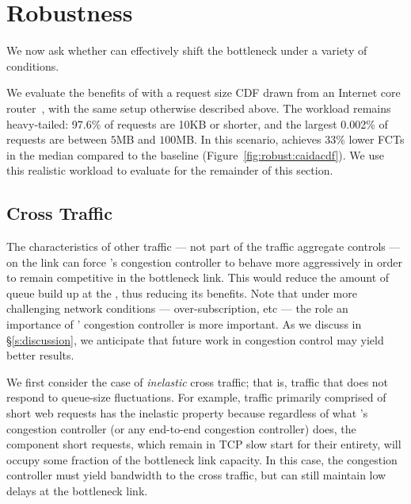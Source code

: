 \section{Robustness}\label{s:robust}

We now ask whether \name can effectively shift the bottleneck under a variety of conditions.


We evaluate the benefits of \name with a request size CDF
drawn from an Internet core router~\cite{caida-dataset}, with the same setup otherwise described above.
The workload remains heavy-tailed: 97.6\% of requests are 10KB or shorter, and the largest 0.002\% of requests are between $5$MB and $100$MB.
In this scenario, \name achieves 33\% lower FCTs in the median compared to the baseline (Figure~\ref{fig:robust:caidacdf}). We use this realistic workload to evaluate \name for the remainder of this section.


\subsection{Cross Traffic}\label{s:robust:cross}

The characteristics of other traffic --- not part of the traffic aggregate \name controls --- on the link can force \name's congestion controller to behave more aggressively in order to remain competitive in the bottleneck link. This would reduce the amount of queue build up at the \name, thus reducing its benefits.
Note that under more challenging network conditions --- over-subscription, etc --- the role an importance of \name' congestion controller is more important.  As we discuss in \S\ref{s:discussion}, we anticipate that future work in congestion control may yield better results.


 We first consider the case of \emph{inelastic} cross traffic; that is, traffic that does not respond to queue-size fluctuations.
For example, traffic primarily comprised of short web requests has the inelastic property because regardless of what \name's congestion controller (or any end-to-end congestion controller) does, the component short requests, which remain in TCP slow start for their entirety, will occupy some fraction of the bottleneck link capacity.
In this case, the congestion controller must yield bandwidth to the cross traffic, but can still maintain low delays at the bottleneck link.

